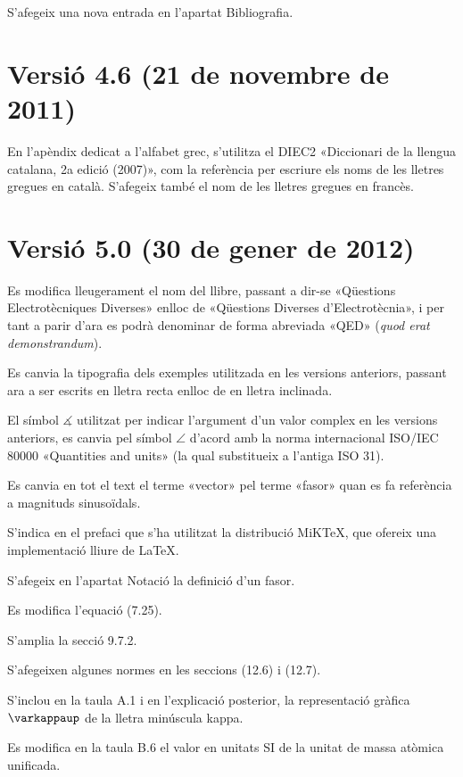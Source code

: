 S'afegeix una nova entrada en l'apartat Bibliografia.


\section*{Versió 4.6 (21 de novembre de 2011)}

En l'apèndix dedicat a l'alfabet grec, s'utilitza el DIEC2 «Diccionari de la llengua catalana, 2a edició (2007)», com la referència per escriure els noms de les lletres gregues en català. S'afegeix també el nom de les lletres gregues en francès.


\section*{Versió 5.0 (30 de gener de 2012)}

Es modifica lleugerament el nom del llibre, passant a dir-se «Qüestions Electrotècniques Diverses» enlloc de «Qüestions Diverses d'Electrotècnia», i per tant a parir d'ara es podrà denominar de forma abreviada «QED» (\emph{quod erat demonstrandum}).

Es canvia la tipografia dels exemples utilitzada en les versions anteriors, passant ara a ser escrits en lletra recta enlloc de en lletra inclinada.

El símbol $\measuredangle$ utilitzat per indicar l'argument d'un valor complex en les versions anteriors, es canvia pel símbol $\angle$ d'acord amb la norma internacional ISO/IEC 80000 «Quantities and units» (la qual substitueix a l'antiga ISO 31).

Es canvia en tot el text el terme «vector» pel terme «fasor» quan es fa referència a magnituds sinusoïdals.

S'indica en el prefaci que s'ha utilitzat la distribució MiK\TeX, que ofereix una implementació lliure de \LaTeX.

S'afegeix en l'apartat Notació la definició d'un fasor.

Es modifica l'equació (7.25).

S'amplia la secció 9.7.2.

S'afegeixen algunes normes en les seccions (12.6) i (12.7).

S'inclou en la taula A.1 i en l'explicació posterior, la representació gràfica $\varkappaup$ de la lletra minúscula kappa.

Es modifica en la taula B.6 el valor en unitats SI de la unitat de massa atòmica unificada.

